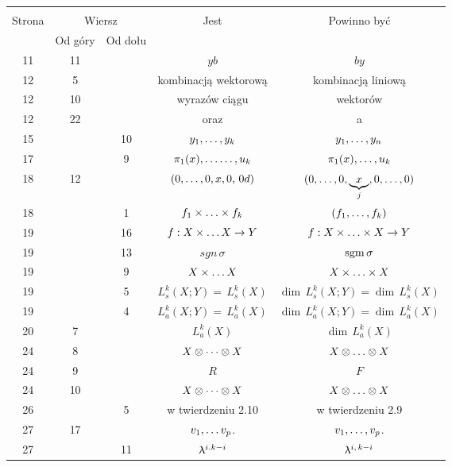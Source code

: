 \documentclass[a4paper,11pt]{article}
\begin{document}
\newpage
{}
\begin{center}
  \begin{tabular}{|c|c|c|c|c|}
    \hline
    & \multicolumn{2}{c|}{} & & \\
    Strona & \multicolumn{2}{c|}{Wiersz} & Jest
                              & Powinno być \\ \cline{2-3}
    & Od góry & Od dołu & & \\
    \hline
    11  & 11 & & $y b$ & $b y$ \\
    12  &  5 & & kombinacją wektorową &  kombinacją liniową \\
    12  & 10 & & wyrazów ciągu & wektorów \\
    12  & 22 & & oraz & a \\
    15  & & 10 & $y_{ 1 }, \ldots , y_{ k }$ & $y_{ 1 }, \ldots , y_{ n }$ \\
    17  & &  9 & $\pi_{ 1 }( x ), \ldots\ldots, u_{ k }$
           & $\pi_{ 1 }( x ), \ldots, u_{ k }$ \\
    18  & 12 & & $( 0, \ldots, 0, x, 0, \, 0d )$
           & $( 0, \ldots, 0, \underbrace{ x }_{ j }, 0, \ldots, 0 )$ \\
    18  & &  1 & $f_{ 1 } \times \ldots \times f_{ k }$
           & $( f_{ 1 }, \ldots, f_{ k } )$ \\
    19  & & 16 & $f : X \times \ldots X \to Y$ & $f : X \times \ldots \times X \to Y$ \\
    19  & & 13 & $sgn\, \sigma$ & $\mathrm{sgm}\, \sigma$ \\
    19  & &  9 & $X \times \ldots X$ & $X \times \ldots \times X$ \\
    19  & &  5 & $L^{ k }_{ s } ( X; Y ) = \, L^{ k }_{ s } ( X )$
           & $\dim \, L^{ k }_{ s } ( X; Y ) = \dim \, L^{ k }_{ s } ( X )$ \\
    19  & &  4 & $L^{ k }_{ a } ( X; Y ) = \, L^{ k }_{ a } ( X )$
           & $\dim \, L^{ k }_{ a } ( X; Y ) = \dim \, L^{ k }_{ a } ( X )$ \\
    20  &  7 & & $L_{ a }^{ k }( X )$ & $\dim \, L_{ a }^{ k }( X )$ \\
    24  &  8 & & $X \otimes \cdots \otimes X$ & $X \otimes \ldots \otimes X$ \\
    24  &  9 & & $R$ & $F$ \\
    24  & 10 & & $X \otimes \cdots \otimes X$ & $X \otimes \ldots \otimes X$ \\
    26  & &  5 & w twierdzeniu 2.10 & w twierdzeniu 2.9 \\
    27  & 17 & & $v_{ 1 }, \ldots v_{ p }$. & $v_{ 1 }, \ldots, v_{ p }$. \\
    27  & & 11 & $\uplambda^{ i. k - i }$ & $\uplambda^{ i,\, k - i }$ \\

\end{tabular}
\end{center}
\end{document}
